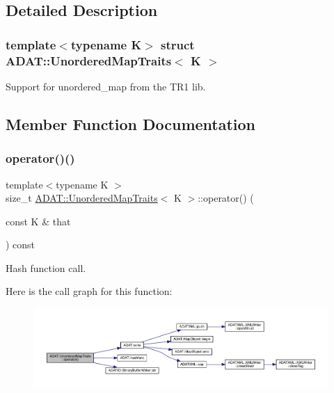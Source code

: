 \subsection{Detailed Description}
\subsubsection*{template$<$typename K$>$\newline
struct A\+D\+A\+T\+::\+Unordered\+Map\+Traits$<$ K $>$}

Support for unordered\+\_\+map from the T\+R1 lib. 

\subsection{Member Function Documentation}
\mbox{\label{structADAT_1_1UnorderedMapTraits_ab9d8c80fb0f561fdadad5be6263d3f94}} 
\subsubsection{\texorpdfstring{operator()()}{operator()()}\hspace{0.1cm}{\footnotesize\ttfamily [1/6]}}
{\footnotesize\ttfamily template$<$typename K $>$ \\
size\+\_\+t \mbox{\hyperlink{structADAT_1_1UnorderedMapTraits}{A\+D\+A\+T\+::\+Unordered\+Map\+Traits}}$<$ K $>$\+::operator() (\begin{DoxyParamCaption}\item[{const K \&}]{that }\end{DoxyParamCaption}) const\hspace{0.3cm}{\ttfamily [inline]}}



Hash function call. 

Here is the call graph for this function\+:
\nopagebreak
\begin{figure}[H]
\begin{center}
\leavevmode
\includegraphics[width=350pt]{dd/d81/structADAT_1_1UnorderedMapTraits_ab9d8c80fb0f561fdadad5be6263d3f94_cgraph}
\end{center}
\end{figure}
\mbox{\label{structADAT_1_1UnorderedMapTraits_ab9d8c80fb0f561fdadad5be6263d3f94}} 
